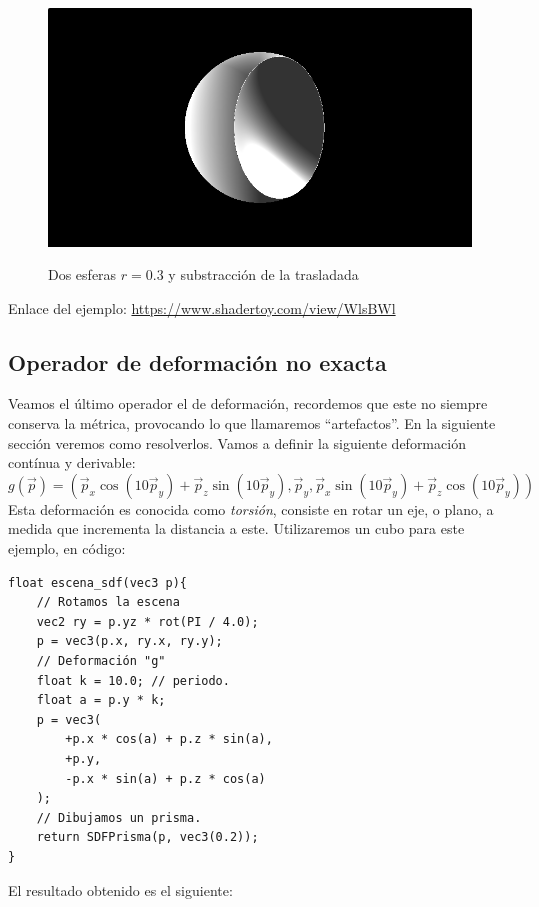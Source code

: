\begin{figure}[H]
  \centering
  \captionsetup{justification=centering}%
  \includegraphics[width=1.0\textwidth]{secciones/imagenes/sdf/3d/sdf_substract_3d.png}\label{fig:sub3d}
  \caption{Dos esferas \(r=0.3\) y substracción de la trasladada}
\end{figure}

Enlace del ejemplo:
\url{https://www.shadertoy.com/view/WlsBWl}

\subsection{Operador de deformación no exacta}
Veamos el último operador el de deformación, recordemos que este no siempre conserva la métrica, provocando lo que llamaremos \enquote{artefactos}. En la siguiente sección veremos como resolverlos. Vamos a definir la siguiente deformación contínua y derivable:
\[g(\Vec{p})=(
\Vec{p}_x \cos(10\Vec{p}_y) + \Vec{p}_z\sin(10\Vec{p}_y),
\Vec{p}_y,
\Vec{p}_x\sin(10\Vec{p}_y) + \Vec{p}_z\cos(10\Vec{p}_y)
)
\]
Esta deformación es conocida como \textit{torsión}, consiste en rotar un eje, o plano, a medida que incrementa la distancia a este. Utilizaremos un cubo para este ejemplo, en código:

\begin{lstlisting}
float escena_sdf(vec3 p){
    // Rotamos la escena
    vec2 ry = p.yz * rot(PI / 4.0);
    p = vec3(p.x, ry.x, ry.y);
    // Deformación "g"
    float k = 10.0; // periodo.
    float a = p.y * k;
    p = vec3(
    	+p.x * cos(a) + p.z * sin(a),
    	+p.y,
        -p.x * sin(a) + p.z * cos(a)
    );
	// Dibujamos un prisma.
    return SDFPrisma(p, vec3(0.2));
}
\end{lstlisting}

El resultado obtenido es el siguiente:

